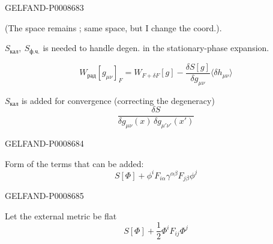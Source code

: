 \begin{GelfandAdjacentEvidence}{GELFAND-P000868}{3}


(The space remains  ; same space, but I change the coord.).

 $S_{\text{кал}},\ S_{\text{ф.ч.}}$
is needed to handle degen. in the stationary-phase expansion.

\begin{equation*}
W_{\text{рад}}[g_{\mu\nu}]_F
=W_{F+\delta F}[g]-\frac{\delta S[g]}{\delta g_{\mu\nu}}
\langle\delta h_{\mu\nu}\rangle
\tag{13}
\end{equation*}

$S_{\text{кал}}$ is added for convergence (correcting the degeneracy)
\[
\frac{\delta S}{\delta g_{\mu\nu}(x)\,\delta g_{\mu'\nu'}(x')}
\]
\end{GelfandAdjacentEvidence}
\begin{GelfandAdjacentEvidence}{GELFAND-P000868}{4}


Form of the terms that can be added:
\begin{equation*}
S[\Phi]+\phi^i F_{i\alpha}\gamma^{\alpha\beta}F_{j\beta}\phi^j
\tag{14}
\end{equation*}
\end{GelfandAdjacentEvidence}
\begin{GelfandAdjacentEvidence}{GELFAND-P000868}{5}


Let the external metric be flat
\begin{equation*}
S[\Phi]+\frac12\Phi^i F_{ij}\Phi^j
\tag{15}
\end{equation*}
\end{GelfandAdjacentEvidence}



